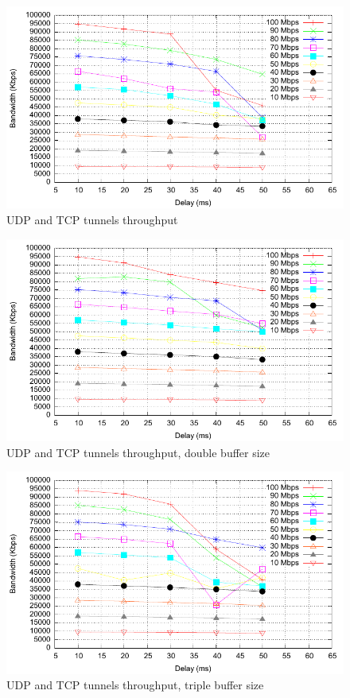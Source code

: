 \begin{figure}
  \centering
  \includegraphics[width=\textwidth]{img/test-mptcp}
  \caption{UDP and TCP tunnels throughput}
  \label{fig:mptcp}
\end{figure}

\begin{figure}
  \centering
  \includegraphics[width=\textwidth]{img/test-mptcp-2}
  \caption{UDP and TCP tunnels throughput, double buffer size}
  \label{fig:mptcp-2}
\end{figure}

\begin{figure}
  \centering
  \includegraphics[width=\textwidth]{img/test-mptcp-3}
  \caption{UDP and TCP tunnels throughput, triple buffer size}
  \label{fig:mptcp-3}
\end{figure}

